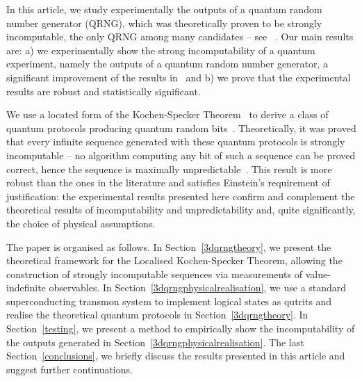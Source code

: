 \documentclass[l1pt]{elsarticle}
\begin{document}
{%


In this article, we study experimentally the outputs of a quantum random number generator (QRNG), which was theoretically proven to be strongly incomputable, the only QRNG among many candidates -- see  ~\cite{Kohlrausch1926,Kragh-2009_RePoss5,qrdiodes,svozil-qct,zeilinger:qct,Quantis2020Q}. Our main results are:
a) we experimentally show
the strong incomputability of a quantum experiment, namely the outputs of a quantum random number generator, a significant improvement of the results in~\cite{abbott2018experimentally} and b)
we prove that the experimental results are robust and statistically significant.



We use a located form of the Kochen-Specker Theorem~\cite{abbott2012strongrandomness,acs-2015-info6040773,2015-AnalyticKS} to derive a class of quantum protocols producing quantum random bits~\cite{aguero_trejo_new_2021,RSPA23}. Theoretically, it was proved that every infinite sequence generated with these quantum protocols is strongly incomputable -- no algorithm computing any bit of such a sequence can be proved correct, hence the sequence is maximally unpredictable~\cite{acs-2015-info6040773}. This result is more robust than the ones in the literature and satisfies Einstein's requirement of justification: the experimental results presented here confirm and complement the theoretical results of incomputability and unpredictability and, quite significantly, the choice of physical assumptions.
}

The paper is organised as follows. In Section~\ref{3dqrngtheory}, we present the theoretical framework for the
 Localised Kochen-Specker Theorem, allowing the construction of strongly incomputable sequences via measurements of value-indefinite observables. In Section~\ref{3dqrngphysicalrealisation}, we use a standard superconducting transmon system to implement logical states as qutrits and realise the theoretical quantum protocols in Section~\ref{3dqrngtheory}.
 In Section~\ref{testing}, we present a method to empirically show the incomputability of the outputs generated in Section~\ref{3dqrngphysicalrealisation}.
 The last Section~\ref{conclusions}, we briefly discuss the results
 presented in this article and suggest further continuations.
\end{document}
